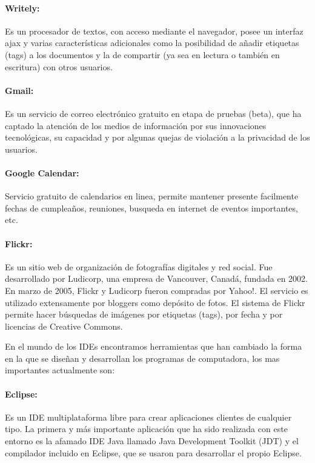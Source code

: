 \paragraph{Writely: \cite{writely}} Es un procesador de textos, con acceso mediante el navegador, posee un interfaz ajax y varias características adicionales como la posibilidad de añadir etiquetas (tags) a los documentos y la de compartir (ya sea en lectura o también en escritura) con otros usuarios.

\paragraph{Gmail: \cite{gmail}} Es un servicio de correo electrónico gratuito en etapa de pruebas (beta), que ha captado la atención de los medios de información por sus innovaciones tecnológicas, su capacidad y por algunas quejas de violación a la privacidad de los usuarios.

\paragraph{Google Calendar: \cite{google_calendar}} Servicio gratuito de calendarios en linea, permite mantener presente facilmente fechas de cumpleaños, reuniones, busqueda en internet de eventos importantes, etc.

\paragraph{Flickr: \cite{flickr}} Es un sitio web de organización de fotografías digitales y red social. Fue desarrollado por Ludicorp, una empresa de Vancouver, Canadá, fundada en 2002. En marzo de 2005, Flickr y Ludicorp fueron compradas por Yahoo!. El servicio es utilizado extensamente por bloggers como depósito de fotos. El sistema de Flickr permite hacer búsquedas de imágenes por etiquetas (tags), por fecha y por licencias de Creative Commons.


En el mundo de los IDEs encontramos herramientas que han cambiado la forma en la que se diseñan y desarrollan los programas de computadora, los mas importantes actualmente son:


\paragraph{Eclipse: \cite{eclipse}} Es un IDE multiplataforma libre para crear aplicaciones clientes de cualquier tipo. La primera y más importante aplicación que ha sido realizada con este entorno es la afamado IDE Java llamado Java Development Toolkit (JDT) y el compilador incluido en Eclipse, que se usaron para desarrollar el propio Eclipse.

